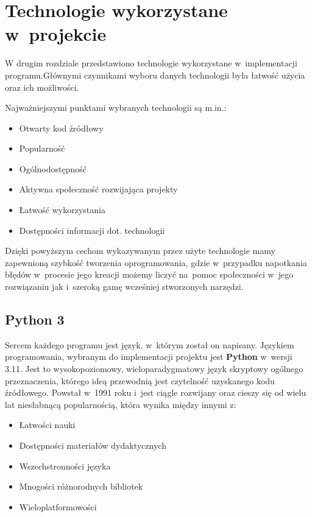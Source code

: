 \chapter{Technologie wykorzystane w~projekcie}

W drugim rozdziale przedstawiono technologie wykorzystane w~implementacji programu.\linebreak Głównymi czynnikami wyboru danych technologii była łatwość użycia oraz ich możliwości.

Najważniejszymi punktami wybranych technologii są m.in.:
\begin{itemize}
	\item Otwarty kod źródłowy
	\item Popularność
	\item Ogólnodostępność
	\item Aktywna społeczność rozwijająca projekty
	\item Łatwość wykorzystania
	\item Dostępności informacji dot. technologii
\end{itemize}

Dzięki powyższym cechom wykazywanym przez użyte technologie mamy zapewnioną szybkość tworzenia oprogramowania, gdzie w~przypadku napotkania błędów w~procesie jego kreacji możemy liczyć na~pomoc społeczności w~jego rozwiązaniu jak i~szeroką gamę wcześniej stworzonych narzędzi.



\section{Python 3}
Sercem każdego programu jest język, w~którym został on napisany. Językiem programowania, wybranym do implementacji projektu jest \textbf{Python} w~wersji 3.11.
Jest to wysokopoziomowy, wieloparadygmatowy język skryptowy ogólnego przeznaczenia, którego ideą przewodnią jest czytelność uzyskanego kodu źródłowego. Powstał w~1991 roku i~jest ciągle rozwijany oraz cieszy się od wielu lat niesłabnącą popularnością, która wynika między innymi z:

\begin{itemize}
	\item Łatwości nauki
	\item Dostępności materiałów dydaktycznych
	\item Wszechstronności języka
	\item Mnogości różnorodnych bibliotek
	\item Wieloplatformowości
\end{itemize}

